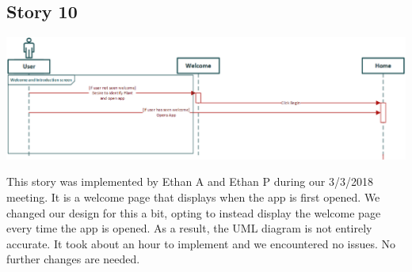 \documentclass[a4paper]{article}
\begin{document}
\subsection{Story 10}
\begin{center}\includegraphics[scale=.66]{Story10.eps}\end{center}
This story was implemented by Ethan A and Ethan P during our 3/3/2018 meeting. It is a welcome page that displays when the app is first opened. We changed our design for this a bit, opting to instead display the welcome page every time the app is opened. As a result, the UML diagram is not entirely accurate. It took about an hour to implement and we encountered no issues. No further changes are needed.
\pagebreak
\end{document}

